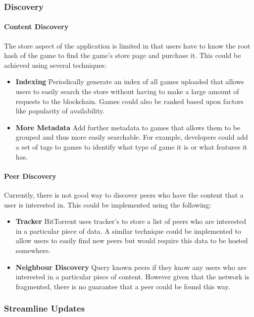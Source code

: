 \subsubsection{Discovery}

\paragraph*{Content Discovery}
The store aspect of the application is limited in that users have to know the root hash of the game to find the game's store page and purchase it. This could be achieved using several techniques:

\begin{itemize}
  \item \textbf{Indexing} Periodically generate an index of all games uploaded that allows users to easily search the store without having to make a large amount of requests to the blockchain. Games could also be ranked based upon factors like popularity of availability. 
  \item \textbf{More Metadata} Add further metadata to games that allows them to be grouped and thus more easily searchable. For example, developers could add a set of tags to games to identify what type of game it is or what features it has.
\end{itemize}

\paragraph*{Peer Discovery}\label{pg:discovery}
Currently, there is not good way to discover peers who have the content that a user is interested in. This could be implemented using the following:

\begin{itemize}
  \item \textbf{Tracker} BitTorrent uses tracker's to store a list of peers who are interested in a particular piece of data. A similar technique could be implemented to allow users to easily find new peers but would require this data to be hosted somewhere.
  \item \textbf{Neighbour Discovery} Query known peers if they know any users who are interested in a particular piece of content. However given that the network is fragmented, there is no guarantee that a peer could be found this way.
\end{itemize}

\subsubsection{Streamline Updates}

